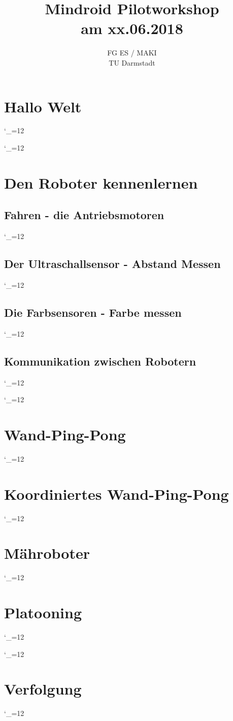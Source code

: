 \documentclass[
	12pt,
	article,
	type=bsc, %
	colorbacktitle,
	instlogo,
	accentcolor=tud1c,
	draft,
	german,
	solution,
	twoside
]{tudexercise}
\newcommand{\solpath}[0]{../../impl/androidApp/app/src/main/java/org/mindroid/android/app/programs/workshop/solutions}
\newcommand{\sol}{\begingroup
  \catcode`_=12 \docodelst}
\newcommand{\docodelst}[1]{
  	
  \endgroup
}
\begin{document}
	\author{}
	\title{Mindroid Pilotworkshop \\ am xx.06.2018}
	\subtitle{FG ES / MAKI \\ TU Darmstadt}
	\subsubtitle{}
	
	\maketitle	
	
	\newpage
	\section{Hallo Welt}
	\sol{HelloWorld}
	\sol{HelloDate}
	
	\newpage
	\section{Den Roboter kennenlernen}	
		\subsection{Fahren - die Antriebsmotoren}	
			\sol{DriveSquare}
		
		\newpage	
		\subsection{Der Ultraschallsensor - Abstand Messen}	
			\sol{ParkingSensor}	
		
		\newpage	
		\subsection{Die Farbsensoren - Farbe messen}
			\sol{ColourTest}
		
		\newpage	
		\subsection{Kommunikation zwischen Robotern}
			\sol{HelloWorldPingB}
			\sol{HelloWorldPingR}
	
	\newpage
	\section{Wand-Ping-Pong}
		\sol{ImpSingleWallPingPong}
	
	\newpage	
	\section{Koordiniertes Wand-Ping-Pong}
		\sol{ImpCoordWallPingPong}
		
	\newpage	
	\section{Mähroboter}
		\sol{LawnMower}
	
	\newpage
	\section{Platooning}
		\sol{Platooning_A}
		\newpage
		\sol{Platooning_B}
	\section{Verfolgung}
		\sol{Follow}
	
\end{document}
